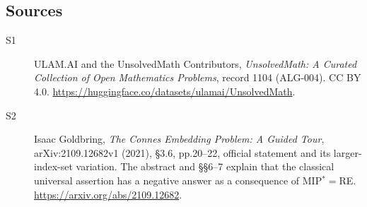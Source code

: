 \documentclass[11pt]{article}
\begin{document}
\subsection{Sources}
\begin{description}
\item[\hypertarget{source:1104:1}{S1}] ULAM.AI and the UnsolvedMath Contributors, \emph{UnsolvedMath: A Curated Collection of Open Mathematics Problems}, record 1104 (ALG-004). CC BY 4.0. \url{https://huggingface.co/datasets/ulamai/UnsolvedMath}.
\item[\hypertarget{source:1104:2}{S2}] Isaac Goldbring, \emph{The Connes Embedding Problem: A Guided Tour}, arXiv:2109.12682v1 (2021), §3.6, pp.20--22, official statement and its larger-index-set variation. The abstract and §§6--7 explain that the classical universal assertion has a negative answer as a consequence of MIP$^*=$RE. \url{https://arxiv.org/abs/2109.12682}.
\end{description}
\label{end:1104}
\end{document}
